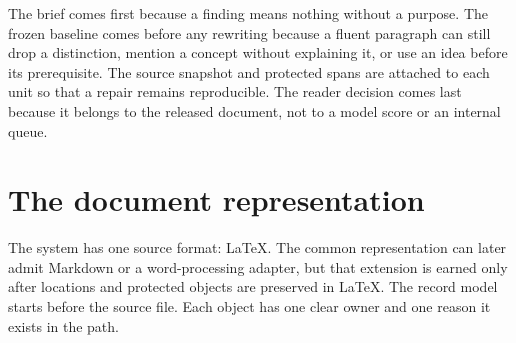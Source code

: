 The brief comes first because a finding means nothing without a purpose. The
frozen baseline comes before any rewriting because a fluent paragraph can still
drop a distinction, mention a concept without explaining it, or use an idea
before its prerequisite. The source snapshot and protected spans are attached to
each unit so that a repair remains reproducible. The reader decision comes last
because it belongs to the released document, not to a model score or an internal
queue.

\section{The document representation}

The system has one source format: LaTeX. The common representation can later
admit Markdown or a word-processing adapter, but that extension is earned only
after locations and protected objects are preserved in LaTeX. The record model
starts before the source file. Each object has one clear owner and one reason it
exists in the path.

